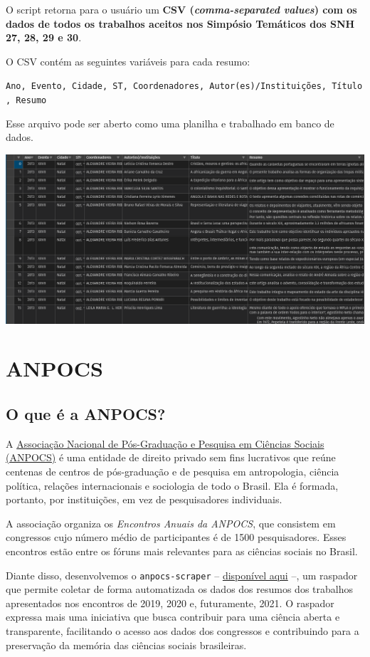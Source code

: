 \documentclass[
]{book}
\begin{document}
O script retorna para o usuário um \textbf{CSV (\emph{comma-separated values}) com os dados de todos os trabalhos aceitos nos Simpósio Temáticos dos SNH 27, 28, 29 e 30}.

O CSV contém as seguintes variáveis para cada resumo:

\texttt{Ano,\ Evento,\ Cidade,\ ST,\ Coordenadores,\ Autor(es)/Instituições,\ Título,\ Resumo}

Esse arquivo pode ser aberto como uma planilha e trabalhado em banco de dados.

\includegraphics{img/ex_csv2.png}

\hypertarget{anpocs}{%
\chapter{ANPOCS}\label{anpocs}}

\hypertarget{o-que-uxe9-a-anpocs}{%
\section{O que é a ANPOCS?}\label{o-que-uxe9-a-anpocs}}

A \href{http://anpocs.com/}{Associação Nacional de Pós-Graduação e Pesquisa em Ciências Sociais (ANPOCS)} é uma entidade de direito privado sem fins lucrativos que reúne centenas de centros de pós-graduação e de pesquisa em antropologia, ciência política, relações internacionais e sociologia de todo o Brasil. Ela é formada, portanto, por instituições, em vez de pesquisadores individuais.

A associação organiza os \emph{Encontros Anuais da ANPOCS}, que consistem em congressos cujo número médio de participantes é de 1500 pesquisadores. Esses encontros estão entre os fóruns mais relevantes para as ciências sociais no Brasil.

Diante disso, desenvolvemos o \texttt{anpocs-scraper} -- \href{https://github.com/vmussa/anpocs-scraper}{disponível aqui} --, um raspador que permite coletar de forma automatizada os dados dos resumos dos trabalhos apresentados nos encontros de 2019, 2020 e, futuramente, 2021. O raspador expressa mais uma iniciativa que busca contribuir para uma ciência aberta e transparente, facilitando o acesso aos dados dos congressos e contribuindo para a preservação da memória das ciências sociais brasileiras.
\end{document}
